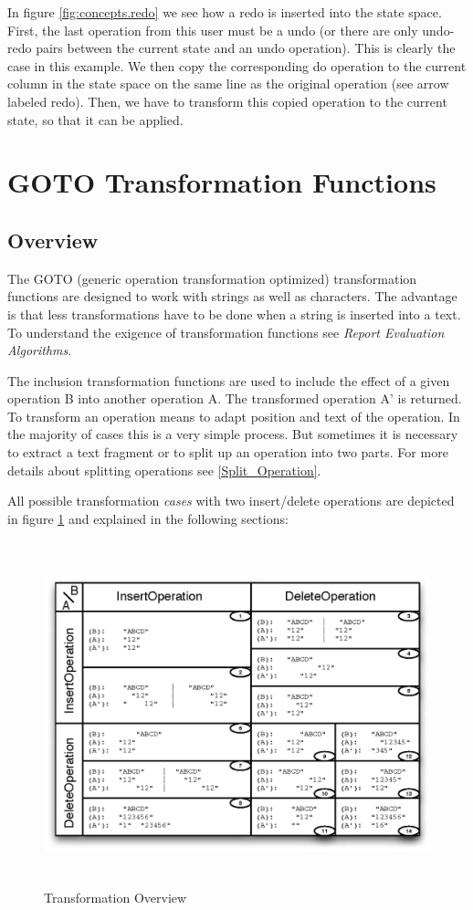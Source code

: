 In figure \ref{fig:concepts.redo} we see how a redo is inserted into the state space. First, the last operation from this user must be a undo (or there are only undo-redo pairs between the current state and an undo operation). This is clearly the case in this example. We then copy the corresponding do operation to the current column in the state space on the same line as the original operation (see arrow labeled redo). Then, we have to transform this copied operation to the current state, so that it can be applied. 


\section{GOTO Transformation Functions}
\label{GOTO Transformation Functions}

\subsection{Overview}
The GOTO (generic operation transformation optimized) transformation functions are designed to work with strings as well as characters. The advantage is that less transformations have to be done when a string is inserted into a text. To understand the exigence of transformation functions see \emph{Report Evaluation Algorithms}.

The inclusion transformation functions are used to include the effect of a given operation B into another operation A. The transformed operation A' is returned. To transform an operation means to adapt position and text of the operation. In the majority of cases this is a very simple process. But sometimes it is necessary to extract a text fragment or to split up an operation into two parts. For more details about splitting operations see \ref{Split_Operation}.

All possible transformation \emph{cases} with two insert/delete operations are depicted in figure \ref{Transformation Overview} and explained in the following sections:
\begin{figure}[H]
\centering
\includegraphics[height=9.98cm,width=13.75cm]{../../images/algo-impl/transform_overview.eps}
\caption{Transformation Overview}
\label{Transformation Overview}
\end{figure}

